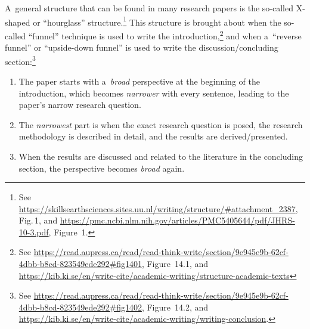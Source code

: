A~general structure that can be found in many research papers is the so-called X-shaped or ``hourglass'' structure.\footnote{See \url{https://skillsearthsciences.sites.uu.nl/writing/structure/\#attachment_2387}, Fig.\,1, and \url{https://pmc.ncbi.nlm.nih.gov/articles/PMC5405644/pdf/JHRS-10-3.pdf}, Figure~1.} This structure is brought about when the so-called ``funnel'' technique is used to write the introduction,\footnote{See  \url{https://read.aupress.ca/read/read-think-write/section/9e945e9b-62cf-4dbb-b8cd-823549ede292\#fig1401}, Figure~14.1, and \url{https://kib.ki.se/en/write-cite/academic-writing/structure-academic-texts}} and when a~``reverse funnel'' or ``upside-down funnel'' is used to write the discussion\slash concluding section:\footnote{See \url{https://read.aupress.ca/read/read-think-write/section/9e945e9b-62cf-4dbb-b8cd-823549ede292\#fig1402}, Figure~14.2, and \url{https://kib.ki.se/en/write-cite/academic-writing/writing-conclusion}.}
\begin{enumerate}
	\item The paper starts with a~\emph{broad} perspective at the beginning of the introduction, which becomes \emph{narrower} with every sentence, leading to the paper's narrow research question.
	\item The \emph{narrowest} part is when the exact research question is posed, the research methodology is described in detail, and the results are derived\slash presented.
	\item When the results are discussed and related to the literature in the concluding section, the perspective becomes \emph{broad} again.
\end{enumerate}

